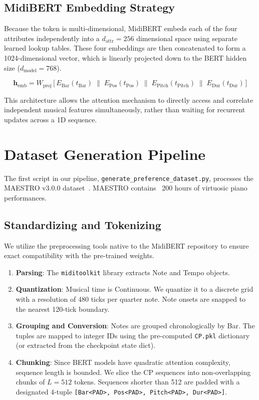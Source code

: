\documentclass[11pt,a4paper]{article}
\begin{document}
\subsection{MidiBERT Embedding Strategy}

Because the token is multi-dimensional, MidiBERT embeds each of the four attributes independently into a $d_{\text{attr}} = 256$ dimensional space using separate learned lookup tables. These four embeddings are then concatenated to form a 1024-dimensional vector, which is linearly projected down to the BERT hidden size ($d_{\text{model}} = 768$).

\begin{equation}
    \mathbf{h}_{\text{emb}} = W_{\text{proj}}\,\bigl[\,
        E_{\text{Bar}}(t_{\text{Bar}})\;\|\;
        E_{\text{Pos}}(t_{\text{Pos}})\;\|\;
        E_{\text{Pitch}}(t_{\text{Pitch}})\;\|\;
        E_{\text{Dur}}(t_{\text{Dur}})
    \,\bigr]
\end{equation}

This architecture allows the attention mechanism to directly access and correlate independent musical features simultaneously, rather than waiting for recurrent updates across a 1D sequence.

\section{Dataset Generation Pipeline}
\label{sec:dataset}

The first script in our pipeline, \texttt{generate\_preference\_dataset.py}, processes the MAESTRO v3.0.0 dataset~\cite{maestro}. MAESTRO contains ~200 hours of virtuosic piano performances. 

\subsection{Standardizing and Tokenizing}

We utilize the preprocessing tools native to the MidiBERT repository to ensure exact compatibility with the pre-trained weights.
\begin{enumerate}
    \item \textbf{Parsing}: The \texttt{miditoolkit} library extracts Note and Tempo objects.
    \item \textbf{Quantization}: Musical time is Continuous. We quantize it to a discrete grid with a resolution of 480 ticks per quarter note. Note onsets are snapped to the nearest 120-tick boundary.
    \item \textbf{Grouping and Conversion}: Notes are grouped chronologically by Bar. The tuples are mapped to integer IDs using the pre-computed \texttt{CP.pkl} dictionary (or extracted from the checkpoint state dict).
    \item \textbf{Chunking}: Since BERT models have quadratic attention complexity, sequence length is bounded. We slice the CP sequences into non-overlapping chunks of $L = 512$ tokens. Sequences shorter than 512 are padded with a designated 4-tuple \texttt{[Bar<PAD>, Pos<PAD>, Pitch<PAD>, Dur<PAD>]}.
\end{enumerate}
\end{document}
